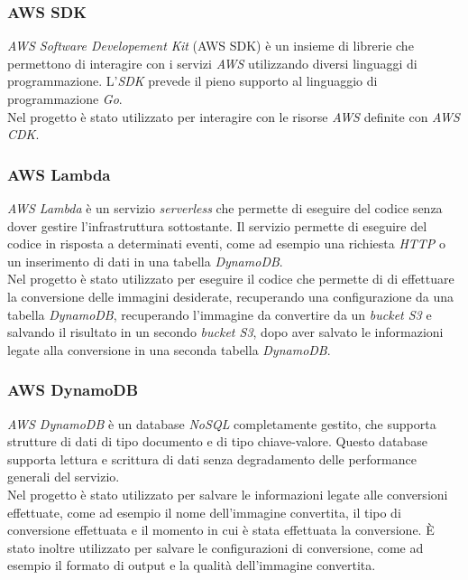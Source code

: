 \subsubsection{AWS SDK}

\emph{AWS Software Developement Kit} (AWS SDK) è un insieme di librerie che
permettono di interagire con i servizi \emph{AWS} utilizzando diversi linguaggi
di programmazione. L'\emph{SDK} prevede il pieno supporto al linguaggio di
programmazione \emph{Go}. \\
Nel progetto è stato utilizzato per interagire con le risorse \emph{AWS}
definite con \emph{AWS CDK}. \cite{go-aws-sdk}

\subsubsection{AWS Lambda}

\emph{AWS Lambda} è un servizio \emph{serverless} che permette di eseguire del
codice senza dover gestire l'infrastruttura sottostante. Il servizio permette di
eseguire del codice in risposta a determinati eventi, come ad esempio una
richiesta \emph{HTTP} o un inserimento di dati in una tabella \emph{DynamoDB}.
\\
Nel progetto è stato utilizzato per eseguire il codice che permette di
di effettuare la conversione delle immagini desiderate, recuperando una
configurazione da una tabella \emph{DynamoDB}, recuperando l'immagine da
convertire da un \emph{bucket S3} e salvando il risultato in un secondo
\emph{bucket S3}, dopo aver salvato le informazioni legate alla conversione in
una seconda tabella \emph{DynamoDB}.

\subsubsection{AWS DynamoDB}

\emph{AWS DynamoDB} è un database \emph{NoSQL} completamente gestito, che
supporta strutture di dati di tipo documento e di tipo chiave-valore. Questo
database supporta lettura e scrittura di dati senza degradamento delle
performance generali del servizio. \\
Nel progetto è stato utilizzato per salvare le informazioni legate alle
conversioni effettuate, come ad esempio il nome dell'immagine convertita, il
tipo di conversione effettuata e il momento in cui è stata effettuata la
conversione. È stato inoltre utilizzato per salvare le configurazioni di
conversione, come ad esempio il formato di output e la qualità dell'immagine
convertita.

